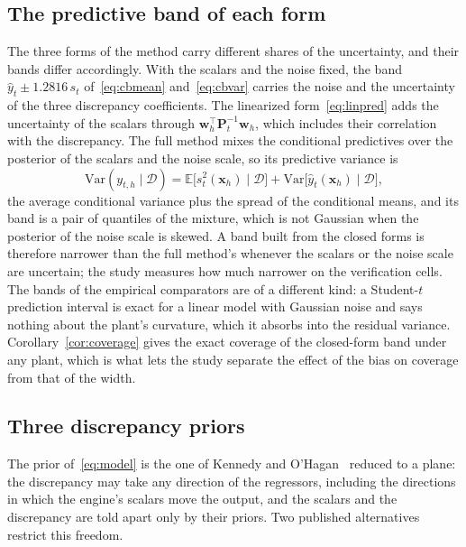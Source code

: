 \subsection{The predictive band of each form}

The three forms of the method carry different shares of the uncertainty, and their bands differ accordingly. With the scalars
and the noise fixed, the band $\hat y_t\pm1.2816\,s_t$ of~\eqref{eq:cbmean} and~\eqref{eq:cbvar} carries the noise and the
uncertainty of the three discrepancy coefficients. The linearized form~\eqref{eq:linpred} adds the uncertainty of the scalars
through $\mathbf w_h^{\top}\mathbf P_t^{-1}\mathbf w_h$, which includes their correlation with the discrepancy. The full method
mixes the conditional predictives over the posterior of the scalars and the noise scale, so its predictive variance is
\begin{equation}
\mathrm{Var}(y_{t,h}\mid\mathcal D)=\mathbb E\big[s_t^2(\mathbf x_h)\mid\mathcal D\big]+\mathrm{Var}\big[\hat y_t(\mathbf x_h)\mid\mathcal D\big],
\label{eq:mixvar}
\end{equation}
the average conditional variance plus the spread of the conditional means, and its band is a pair of quantiles of the mixture,
which is not Gaussian when the posterior of the noise scale is skewed. A band built from the closed forms is therefore narrower
than the full method's whenever the scalars or the noise scale are uncertain; the study measures how much narrower on the
verification cells. The bands of the empirical comparators are of a different kind: a Student-$t$ prediction interval is exact
for a linear model with Gaussian noise and says nothing about the plant's curvature, which it absorbs into the residual variance.
Corollary~\ref{cor:coverage} gives the exact coverage of the closed-form band under any plant, which is what lets the study
separate the effect of the bias on coverage from that of the width.

\subsection{Three discrepancy priors}\label{sec:method-priors}

The prior of~\eqref{eq:model} is the one of Kennedy and O'Hagan~\cite{ko} reduced to a plane: the discrepancy may take any
direction of the regressors, including the directions in which the engine's scalars move the output, and the scalars and
the discrepancy are told apart only by their priors. Two published alternatives restrict this freedom.

